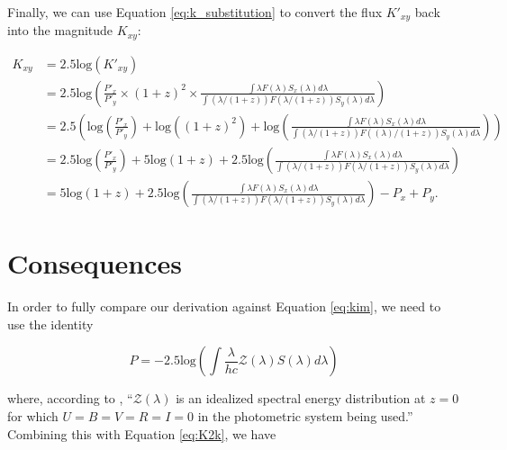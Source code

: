\documentclass[linenumbers]{aastex631}
\begin{document}
Finally, we can use Equation \ref{eq:k_substitution} to convert the flux $K'_{xy}$ back
into the magnitude $K_{xy}$:

\begin{equation}
\begin{aligned}
\label{eq:K2k}
  K_{xy} &= 2.5\text{log}(K'_{xy}) \\
         &= 2.5\text{log}\left(
            \frac{P'_x}{P'_y} \times (1 + z)^2 \times
            \frac{\int \lambda F(\lambda) S_x(\lambda) d\lambda}
                 {\int (\lambda / (1+z)) F(\lambda / (1+z)) S_y(\lambda) d\lambda}\right) \\
         &= 2.5 \left(
            \text{log} \left( \frac{P'_x}{P'_y} \right)
            + \text{log}( {(1 + z)^2})
            + \text{log}\left( \frac{\int \lambda F(\lambda) S_x(\lambda) d\lambda}
                                    {\int (\lambda / (1+z)) F((\lambda)/ (1+z)) S_y(\lambda) d\lambda}
            \right) \right) \\
         &= 2.5 \text{log} \left( \frac{P'_x}{P'_y} \right)
            + 5 \text{log} (1 + z)
            + 2.5 \text{log} \left(
              \frac{\int \lambda F(\lambda) S_x(\lambda) d\lambda}
                   {\int (\lambda / (1+z)) F(\lambda / (1+z)) S_y(\lambda) d\lambda} \right) \\
         &= 5 \text{log} (1 + z)
            + 2.5 \text{log} \left(
              \frac{\int \lambda F(\lambda) S_x(\lambda) d\lambda}
                   {\int (\lambda / (1+z)) F(\lambda / (1+z)) S_y(\lambda) d\lambda} \right)
            - P_x + P_y .
\end{aligned}
\end{equation}

\section{Consequences}
\label{sec:consequences}

In order to fully compare our derivation against Equation \ref{eq:kim}, we need
to use the identity

\begin{equation}
  P = -2.5 \text{log} \left( \int \frac{\lambda}{hc} \mathcal{Z}(\lambda) S(\lambda) d\lambda \right)
\end{equation}

\noindent where, according to \citet{kim1996}, ``$\mathcal{Z}(\lambda)$ is an
idealized spectral energy distribution at $z = 0$ for which
$U = B = V = R = I = 0$ in the photometric system being used.'' Combining this
with Equation \ref{eq:K2k}, we have
\end{document}
